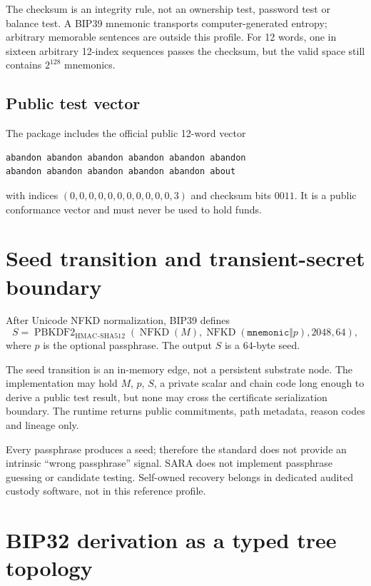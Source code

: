\documentclass[10pt,a4paper]{article}
\newcommand{\hmac}{\operatorname{HMAC\!\mbox{-}SHA512}}
\begin{document}
\begin{boundbox}
The checksum is an integrity rule, not an ownership test, password test or balance test. A BIP39 mnemonic transports computer-generated entropy; arbitrary memorable sentences are outside this profile. For 12 words, one in sixteen arbitrary 12-index sequences passes the checksum, but the valid space still contains $2^{128}$ mnemonics.
\end{boundbox}

\subsection{Public test vector}
The package includes the official public 12-word vector
\begin{Verbatim}[breaklines=true,fontsize=\small]
abandon abandon abandon abandon abandon abandon
abandon abandon abandon abandon abandon about
\end{Verbatim}
with indices $(0,0,0,0,0,0,0,0,0,0,0,3)$ and checksum bits $0011$. It is a public conformance vector and must never be used to hold funds.

\section{Seed transition and transient-secret boundary}

After Unicode NFKD normalization, BIP39 defines
\[
S=\operatorname{PBKDF2}_{\hmac}
\left(
\operatorname{NFKD}(M),
\operatorname{NFKD}(\texttt{mnemonic}\Vert p),
2048,64
\right),
\]
where $p$ is the optional passphrase. The output $S$ is a 64-byte seed.

\begin{definitionbox}
The seed transition is an in-memory edge, not a persistent substrate node. The implementation may hold $M$, $p$, $S$, a private scalar and chain code long enough to derive a public test result, but none may cross the certificate serialization boundary. The runtime returns public commitments, path metadata, reason codes and lineage only.
\end{definitionbox}

Every passphrase produces a seed; therefore the standard does not provide an intrinsic ``wrong passphrase'' signal. SARA does not implement passphrase guessing or candidate testing. Self-owned recovery belongs in dedicated audited custody software, not in this reference profile.

\section{BIP32 derivation as a typed tree topology}
\end{document}
